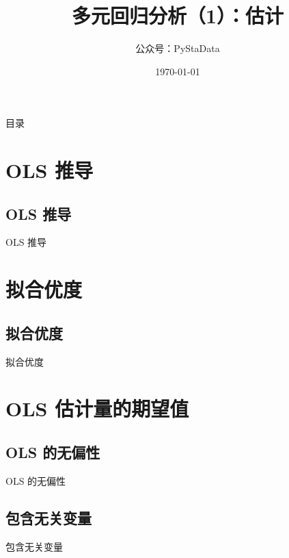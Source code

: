 \documentclass[UTF8]{ctexbeamer}
\begin{document}
\title{多元回归分析（1）：估计}
\author{公众号：PyStaData}
\date{\today}

\frame{\titlepage} %


\begin{frame}{目录}
\begin{multicols}{2}
  \tableofcontents
\end{multicols}
\end{frame}


\section{OLS 推导 }
\subsection{OLS 推导}
\begin{frame}{OLS 推导}
\end{frame}


\section{拟合优度}
\subsection{拟合优度}
\begin{frame}{拟合优度}
\end{frame}

\section{OLS 估计量的期望值}
\subsection{OLS 的无偏性}
\begin{frame}{OLS 的无偏性}
\end{frame}

\subsection{包含无关变量}
\begin{frame}{包含无关变量}
\end{frame}
\end{document}
